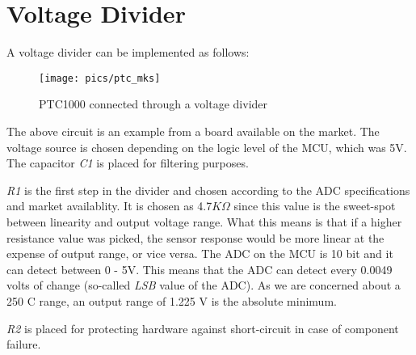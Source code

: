 \section*{Voltage Divider}

A voltage divider can be implemented as follows:

\begin{figure}[H]
    \centering
    \texttt{[image: pics/ptc\_mks]}
    \caption{PTC1000 connected through a voltage divider\cite{mksboard}}
\end{figure}

The above circuit is an example from a board available on the market. \cite{mksboard} The voltage source is chosen depending on the logic level of the MCU, which was 5V. The capacitor \textit{C1} is placed for filtering purposes.

\textit{R1} is the first step in the divider and chosen according to the ADC specifications and market availablity. It is chosen as 4.7$K\Omega$ since this value is the sweet-spot between linearity and output voltage range. What this means is that if a higher resistance value was picked, the sensor response would be more linear at the expense of output range, or vice versa. The ADC on the MCU is 10 bit and it can detect between 0 - 5V. This means that the ADC can detect every 0.0049 volts of change (so-called \textit{LSB} value of the ADC). As we are concerned about a 250 \degree C range, an output range of 1.225 V is the absolute minimum.

\textit{R2} is placed for protecting hardware against short-circuit in case of component failure.


